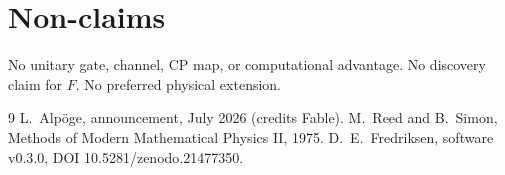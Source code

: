 ﻿\documentclass[11pt]{article}
\begin{document}
\section{Non-claims}
No unitary gate, channel, CP map, or computational advantage. No discovery claim for $F$. No preferred physical extension.

\begin{thebibliography}{9}
 L.~Alp\"oge, announcement, July 2026 (credits Fable).
 M.~Reed and B.~Simon, Methods of Modern Mathematical Physics II, 1975.
 D.~E.~Fredriksen, software v0.3.0, DOI 10.5281/zenodo.21477350.
\end{thebibliography}
\end{document}
